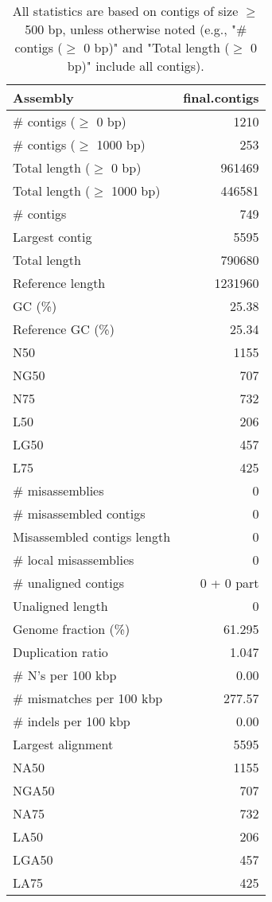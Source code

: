 \documentclass[12pt,a4paper]{article}
\begin{document}
\begin{table}[ht]
\begin{center}
\caption{All statistics are based on contigs of size $\geq$ 500 bp, unless otherwise noted (e.g., "\# contigs ($\geq$ 0 bp)" and "Total length ($\geq$ 0 bp)" include all contigs).}
\begin{tabular}{|l*{1}{|r}|}
\hline
Assembly & final.contigs \\ \hline
\# contigs ($\geq$ 0 bp) & 1210 \\ \hline
\# contigs ($\geq$ 1000 bp) & 253 \\ \hline
Total length ($\geq$ 0 bp) & 961469 \\ \hline
Total length ($\geq$ 1000 bp) & 446581 \\ \hline
\# contigs & 749 \\ \hline
Largest contig & 5595 \\ \hline
Total length & 790680 \\ \hline
Reference length & 1231960 \\ \hline
GC (\%) & 25.38 \\ \hline
Reference GC (\%) & 25.34 \\ \hline
N50 & 1155 \\ \hline
NG50 & 707 \\ \hline
N75 & 732 \\ \hline
L50 & 206 \\ \hline
LG50 & 457 \\ \hline
L75 & 425 \\ \hline
\# misassemblies & 0 \\ \hline
\# misassembled contigs & 0 \\ \hline
Misassembled contigs length & 0 \\ \hline
\# local misassemblies & 0 \\ \hline
\# unaligned contigs & 0 + 0 part \\ \hline
Unaligned length & 0 \\ \hline
Genome fraction (\%) & 61.295 \\ \hline
Duplication ratio & 1.047 \\ \hline
\# N's per 100 kbp & 0.00 \\ \hline
\# mismatches per 100 kbp & 277.57 \\ \hline
\# indels per 100 kbp & 0.00 \\ \hline
Largest alignment & 5595 \\ \hline
NA50 & 1155 \\ \hline
NGA50 & 707 \\ \hline
NA75 & 732 \\ \hline
LA50 & 206 \\ \hline
LGA50 & 457 \\ \hline
LA75 & 425 \\ \hline
\end{tabular}
\end{center}
\end{table}
\end{document}
